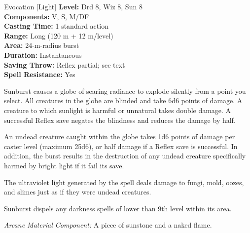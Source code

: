 {Evocation [Light]}
{
	\textbf{Level:}
	Drd 8, Wiz 8, Sun 8\\
	\textbf{Components:}
	V, S, M/DF\\
	\textbf{Casting Time:}
	1 standard action\\
	\textbf{Range:}
	Long (120 m + 12 m/level)\\
	\textbf{Area:}
	24-m-radius burst\\
	\textbf{Duration:}
	Instantaneous\\
	\textbf{Saving Throw:}
	Reflex partial; see text\\
	\textbf{Spell Resistance:}
	Yes\\
}
{
	Sunburst causes a globe of searing radiance to explode silently from a point you select. All creatures in the globe are blinded and take 6d6 points of damage. A creature to which sunlight is harmful or unnatural takes double damage. A successful Reflex save negates the blindness and reduces the damage by half.

	An undead creature caught within the globe takes 1d6 points of damage per caster level (maximum 25d6), or half damage if a Reflex save is successful. In addition, the burst results in the destruction of any undead creature specifically harmed by bright light if it fail its save.

	The ultraviolet light generated by the spell deals damage to fungi, mold, oozes, and slimes just as if they were undead creatures.

	Sunburst dispels any darkness spells of lower than 9th level within its area.

	\textit{Arcane Material Component:}
	A piece of sunstone and a naked flame.

}
